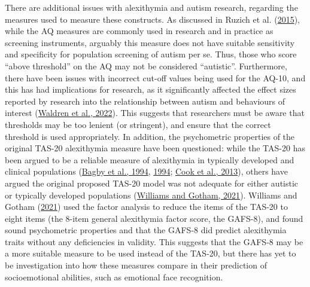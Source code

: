 \documentclass[
]{article}
\begin{document}
There are additional issues with alexithymia and autism research, regarding the measures used to measure these constructs. As discussed in Ruzich et al. (\protect\hyperlink{ref-ruzich2015a}{2015}), while the AQ measures are commonly used in research and in practice as screening instruments, arguably this measure does not have suitable sensitivity and specificity for population screening of autism per se. Thus, those who score ``above threshold'' on the AQ may not be considered ``autistic''. Furthermore, there have been issues with incorrect cut-off values being used for the AQ-10, and this has had implications for research, as it significantly affected the effect sizes reported by research into the relationship between autism and behaviours of interest (\protect\hyperlink{ref-waldren2022a}{Waldren et al., 2022}). This suggests that researchers must be aware that thresholds may be too lenient (or stringent), and ensure that the correct threshold is used appropriately. In addition, the psychometric properties of the original TAS-20 alexithymia measure have been questioned: while the TAS-20 has been argued to be a reliable measure of alexithymia in typically developed and clinical populations (\protect\hyperlink{ref-bagby1994a}{Bagby et al., 1994}, \protect\hyperlink{ref-bagby1994a}{1994}; \protect\hyperlink{ref-cook2013a}{Cook et al., 2013}), others have argued the original proposed TAS-20 model was not adequate for either autistic or typically developed populations (\protect\hyperlink{ref-williams2021a}{Williams and Gotham, 2021}). Williams and Gotham (\protect\hyperlink{ref-williams2021a}{2021}) used the factor analysis to reduce the items of the TAS-20 to eight items (the 8-item general alexithymia factor score, the GAFS-8), and found sound psychometric properties and that the GAFS-8 did predict alexithymia traits without any deficiencies in validity. This suggests that the GAFS-8 may be a more suitable measure to be used instead of the TAS-20, but there has yet to be investigation into how these measures compare in their prediction of socioemotional abilities, such as emotional face recognition.
\end{document}

